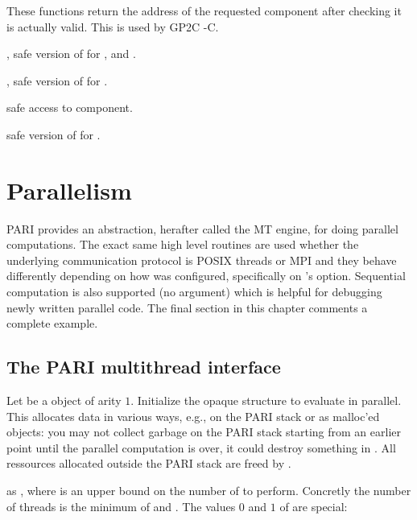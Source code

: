 {These functions return the address of the requested component after checking
it is actually valid. This is used by GP2C -C.

, safe version of  for ,
 and .

, safe version of  for .

 safe access to  component.

 safe version of
 for .

\newpage
\chapter{Parallelism}

PARI provides an abstraction, herafter called the MT engine, for doing
parallel computations. The exact same high level routines are used whether
the underlying communication protocol is POSIX threads or MPI and they behave
differently depending on how  was configured, specifically on
's  option. Sequential computation is also supported
(no  argument) which is helpful for debugging newly written
parallel code. The final section in this chapter comments a complete example.

\section{The PARI multithread interface}

 Let 
be a  object of arity $1$.  Initialize the opaque structure
 to evaluate  in parallel. This allocates data in
various ways, e.g., on the PARI stack or as malloc'ed objects: you may not
collect garbage on the PARI stack starting from an earlier  point
until the parallel computation is over, it could destroy something in .
All ressources allocated outside the PARI stack are freed by
.

as , where  is an upper bound on the number
of  to perform. Concretly the number of threads is the minimum
of  and . The values $0$ and $1$ of  are
special:

}

